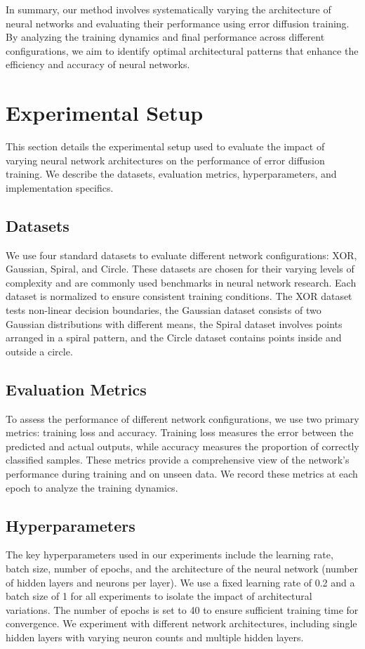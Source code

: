 \documentclass{article} %
\begin{document}
In summary, our method involves systematically varying the architecture of neural networks and evaluating their performance using error diffusion training. By analyzing the training dynamics and final performance across different configurations, we aim to identify optimal architectural patterns that enhance the efficiency and accuracy of neural networks.

\section{Experimental Setup}
\label{sec:experimental}

This section details the experimental setup used to evaluate the impact of varying neural network architectures on the performance of error diffusion training. We describe the datasets, evaluation metrics, hyperparameters, and implementation specifics.

\subsection{Datasets}
We use four standard datasets to evaluate different network configurations: XOR, Gaussian, Spiral, and Circle. These datasets are chosen for their varying levels of complexity and are commonly used benchmarks in neural network research. Each dataset is normalized to ensure consistent training conditions. The XOR dataset tests non-linear decision boundaries, the Gaussian dataset consists of two Gaussian distributions with different means, the Spiral dataset involves points arranged in a spiral pattern, and the Circle dataset contains points inside and outside a circle.

\subsection{Evaluation Metrics}
To assess the performance of different network configurations, we use two primary metrics: training loss and accuracy. Training loss measures the error between the predicted and actual outputs, while accuracy measures the proportion of correctly classified samples. These metrics provide a comprehensive view of the network's performance during training and on unseen data. We record these metrics at each epoch to analyze the training dynamics.

\subsection{Hyperparameters}
The key hyperparameters used in our experiments include the learning rate, batch size, number of epochs, and the architecture of the neural network (number of hidden layers and neurons per layer). We use a fixed learning rate of 0.2 and a batch size of 1 for all experiments to isolate the impact of architectural variations. The number of epochs is set to 40 to ensure sufficient training time for convergence. We experiment with different network architectures, including single hidden layers with varying neuron counts and multiple hidden layers.
\end{document}

